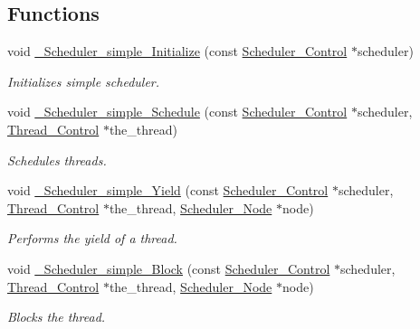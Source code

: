\subsection*{Functions}
\begin{DoxyCompactItemize}
\item 
void \mbox{\hyperlink{group__RTEMSScoreSchedulerSimple_ga036369fb427f35c229253a33f82c2939}{\+\_\+\+Scheduler\+\_\+simple\+\_\+\+Initialize}} (const \mbox{\hyperlink{struct__Scheduler__Control}{Scheduler\+\_\+\+Control}} $\ast$scheduler)
\begin{DoxyCompactList}\small\item\em Initializes simple scheduler. \end{DoxyCompactList}\item 
void \mbox{\hyperlink{group__RTEMSScoreSchedulerSimple_gac80488d4e091046dd3fa048c14b84995}{\+\_\+\+Scheduler\+\_\+simple\+\_\+\+Schedule}} (const \mbox{\hyperlink{struct__Scheduler__Control}{Scheduler\+\_\+\+Control}} $\ast$scheduler, \mbox{\hyperlink{struct__Thread__Control}{Thread\+\_\+\+Control}} $\ast$the\+\_\+thread)
\begin{DoxyCompactList}\small\item\em Schedules threads. \end{DoxyCompactList}\item 
void \mbox{\hyperlink{group__RTEMSScoreSchedulerSimple_gacbdfbb5b5fa2df49606df7bda8a69431}{\+\_\+\+Scheduler\+\_\+simple\+\_\+\+Yield}} (const \mbox{\hyperlink{struct__Scheduler__Control}{Scheduler\+\_\+\+Control}} $\ast$scheduler, \mbox{\hyperlink{struct__Thread__Control}{Thread\+\_\+\+Control}} $\ast$the\+\_\+thread, \mbox{\hyperlink{structScheduler__Node}{Scheduler\+\_\+\+Node}} $\ast$node)
\begin{DoxyCompactList}\small\item\em Performs the yield of a thread. \end{DoxyCompactList}\item 
void \mbox{\hyperlink{group__RTEMSScoreSchedulerSimple_ga34e93fa9cafb272a16320fe540ac86a3}{\+\_\+\+Scheduler\+\_\+simple\+\_\+\+Block}} (const \mbox{\hyperlink{struct__Scheduler__Control}{Scheduler\+\_\+\+Control}} $\ast$scheduler, \mbox{\hyperlink{struct__Thread__Control}{Thread\+\_\+\+Control}} $\ast$the\+\_\+thread, \mbox{\hyperlink{structScheduler__Node}{Scheduler\+\_\+\+Node}} $\ast$node)
\begin{DoxyCompactList}\small\item\em Blocks the thread. \end{DoxyCompactList}\item 

\end{DoxyCompactItemize}
